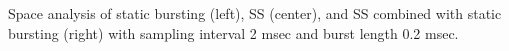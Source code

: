 \label{fig:hcct-space} Space analysis of static bursting (left), SS (center), and SS combined with static bursting (right) with sampling interval 2 msec and burst length 0.2 msec.


